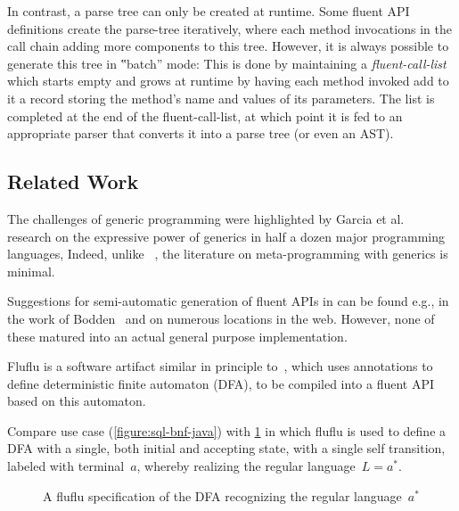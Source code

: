 In contrast, a parse tree can only be created at runtime.
Some fluent API definitions create the parse-tree
iteratively, where each method invocations in the call chain adding
more components to this tree.
However, it is always possible to generate this tree in ‟batch” mode:
This is done by maintaining a \emph{fluent-call-list} which
starts empty and grows at runtime by having each method invoked add to it
a record storing the method's name and values of its parameters.
The list is completed at the end of the fluent-call-list, at which point it is
fed to an appropriate parser that converts it into a parse tree (or even an
AST).

\subsection{Related Work}
The challenges of \Java generic programming were highlighted by Garcia et
al.~\cite{Garcia:Jarvi:Lumsdaine:Siek:Willcock:03} research on the expressive
power of generics in half a dozen major programming languages, 
Indeed, unlike \CC~\cite{Austern:1998,Musser:Stepanov:1989,
Backhouse:Jansson:1999, Dehnert:Stepanov:2000,Gil:Gutterman:98,Abrahams:Gurtovoy:04}, the literature on meta-programming with \Java
generics is minimal. 

Suggestions for semi-automatic generation of fluent APIs in \Java can be found
e.g., in the work of Bodden~\cite{Bodden:14} and on numerous locations in the
web. However, none of these matured into an actual general purpose
implementation.  

Fluflu is a software artifact similar
in principle to~\Fajita, which uses \Java annotations to define deterministic finite
automaton (DFA), to be compiled into a fluent API based on this automaton. 

Compare \Fajita use case (\cref{figure:sql-bnf-java}) with \cref{figure:fluflu} in
which fluflu is used to define a DFA with a single, both initial and
accepting state, with a single self transition, labeled
with terminal~$a$, whereby realizing the regular language~$L=a^*$.

\begin{figure}[H]
  \caption{\label{figure:fluflu}
    A fluflu specification of the DFA recognizing the regular language~$a^*$}
\end{figure}
